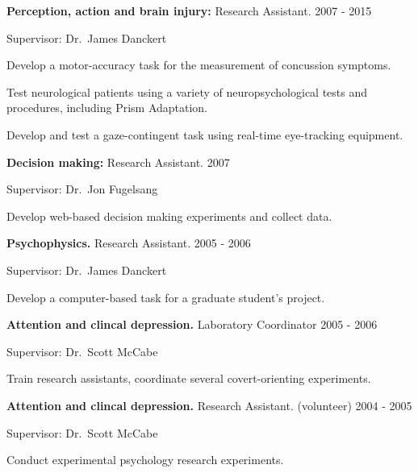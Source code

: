 \documentclass[10pt]{article}
\newenvironment{innerlist}[1][\enskip\textbullet]%
        {\begin{compactenum}[#1]}{\end{compactenum}}
\providecommand{\tightlist}{%
  \setlength{\itemsep}{0pt}\setlength{\parskip}{0pt}}
\begin{document}
\begin{outerlist}
\tightlist
\item
  \textbf{Perception, action and brain injury:} Research Assistant.
  \hfill 2007 - 2015

 \begin{innerlist}
  \tightlist
  \item
    Supervisor: Dr.~James Danckert
  \item
    Develop a motor-accuracy task for the measurement of concussion
    symptoms.
  \item
    Test neurological patients using a variety of neuropsychological
    tests and procedures, including Prism Adaptation.
  \item
    Develop and test a gaze-contingent task using real-time eye-tracking
    equipment.
 \end{innerlist}
\item
  \textbf{Decision making:} Research Assistant. \hfill             2007

 \begin{innerlist}
  \tightlist
  \item
    Supervisor: Dr.~Jon Fugelsang
  \item
    Develop web-based decision making experiments and collect data.
 \end{innerlist}
\item
  \textbf{Psychophysics.} Research Assistant. \hfill               2005
  - 2006

 \begin{innerlist}
  \tightlist
  \item
    Supervisor: Dr.~James Danckert
  \item
    Develop a computer-based task for a graduate student's project.
 \end{innerlist}
\item
  \textbf{Attention and clincal depression.} Laboratory Coordinator
  \hfill                 2005 - 2006

 \begin{innerlist}
  \tightlist
  \item
    Supervisor: Dr.~Scott McCabe
  \item
    Train research assistants, coordinate several covert-orienting
    experiments.
 \end{innerlist}
\item
  \textbf{Attention and clincal depression.} Research Assistant.
  (volunteer) \hfill                    2004 - 2005

 \begin{innerlist}
  \tightlist
  \item
    Supervisor: Dr.~Scott McCabe
  \item
    Conduct experimental psychology research experiments.
 \end{innerlist}
\end{outerlist}
\end{document}
